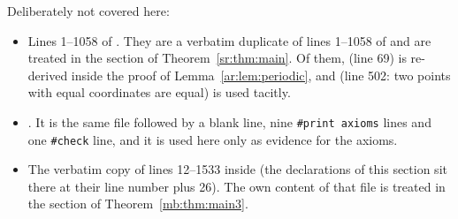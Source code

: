 Deliberately not covered here:
\begin{itemize}
\item Lines 1--1058 of . They are a verbatim duplicate of lines 1--1058 of
 and are treated in the section of Theorem~\ref{sr:thm:main}. Of them, 
(line 69) is re-derived inside the proof of Lemma~\ref{ar:lem:periodic}, and  (line 502: two points
with equal coordinates are equal) is used tacitly.
\item {}. It is the same file followed by a blank line, nine
\texttt{\#print axioms} lines and one \texttt{\#check} line, and it is used here only as evidence for the axioms.
\item The verbatim copy of lines 12--1533 inside  (the declarations of
this section sit there at their line number plus 26). The own content of that file is treated
in the section of Theorem~\ref{mb:thm:main3}.
\end{itemize}
\endgroup
